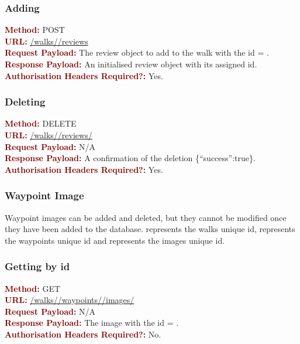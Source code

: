 \documentclass[11pt,a4paper]{report}
\begin{document}
\subsubsection{Adding}
\textbf{\textcolor{Maroon}{Method:}} POST\\
\textbf{\textcolor{Maroon}{URL:}} \url{/walks/}\url{/reviews}\\
\textbf{\textcolor{Maroon}{Request Payload:}} The review object to add to the walk with the id = .\\
\textbf{\textcolor{Maroon}{Response Payload:}} An initialised review object with its assigned id.\\
\textbf{\textcolor{Maroon}{Authorisation Headers Required?:}} Yes.

\subsubsection{Deleting}
\textbf{\textcolor{Maroon}{Method:}} DELETE\\
\textbf{\textcolor{Maroon}{URL:}} \url{/walks/}\url{/reviews/}\\
\textbf{\textcolor{Maroon}{Request Payload:}} N/A\\
\textbf{\textcolor{Maroon}{Response Payload:}} A confirmation of the deletion \{``success'':true\}.\\
\textbf{\textcolor{Maroon}{Authorisation Headers Required?:}} Yes.

\subsubsection{Waypoint Image}
Waypoint images can be added and deleted, but they cannot be modified once they have been added to the database.  represents the walks unique id,  represents the waypoints unique id and  represents the images unique id. 

\subsubsection{Getting by id}
\textbf{\textcolor{Maroon}{Method:}} GET\\
\textbf{\textcolor{Maroon}{URL:}} \url{/walks/}\url{/waypoints/}\url{/images/}\\
\textbf{\textcolor{Maroon}{Request Payload:}} N/A\\
\textbf{\textcolor{Maroon}{Response Payload:}} The image with the id = .\\
\textbf{\textcolor{Maroon}{Authorisation Headers Required?:}} No.
\end{document}
